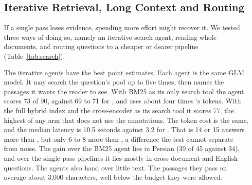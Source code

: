 \subsection{Iterative Retrieval, Long Context and Routing}
\label{sec:search}

If a single pass loses evidence, spending more effort might recover it. We tested three ways of doing so, namely an iterative search agent, reading whole documents, and routing questions to a cheaper or dearer pipeline (Table~\ref{tab:search}).


The iterative agents have the best point estimates. Each agent is the same GLM model. It may search the question's pool up to five times, then names the passages it wants the reader to see. With BM25 as its only search tool the agent scores 73 of 90, against 69 to 71 for \hr{}, and uses about four times \hybrid's tokens. With the full hybrid index and the cross-encoder as its search tool it scores 77, the highest of any arm that does not use the annotations. The token cost is the same, and the median latency is 10.5 seconds against 3.2 for \hr. That is 14 or 15 answers more than \hybrid, but only 6 to 8 more than \hr, a difference the test cannot separate from noise. The gain over the BM25 agent lies in Persian (39 of 45 against 34), and over the single-pass pipelines it lies mostly in cross-document and English questions. The agents also hand over little text. The passages they pass on average about 3,000 characters, well below the budget they were allowed.

